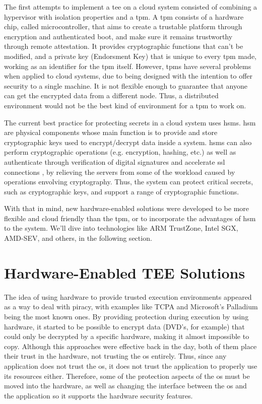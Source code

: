 The first attempts to implement a \gls{tee} on a cloud system consisted of combining a hypervisor with isolation properties and a \gls{tpm}. 
A \gls{tpm} \cite{tpmPaper} consists of a hardware chip, called microcontroller, that aims to create a trustable platform through encryption and authenticated boot, and make sure it remains trustworthy through remote attestation. 
It provides cryptographic functions that can't be modified, and a private key (Endorsment Key) that is unique to every \gls{tpm} made, working as an identifier for the \gls{tpm} itself.
However, \gls{tpm}s have several problems when applied to cloud systems, due to being designed with the intention to offer security to a single machine. It is not flexible enough to guarantee that anyone can get the encrypted data from a different node.
Thus, a distributed environment would not be the best kind of environment for a \gls{tpm} to work on.

The current best practice for protecting secrets in a cloud system uses \gls{hsm}s. 
\gls{hsm} \cite{hsmPaper} are physical components whose main function is to provide and store cryptographic keys used to encrypt/decrypt data inside a system. \gls{hsm}s can also perform cryptographic operations (e.g. encryption, hashing, etc.) as well as authenticate through verification of digital signatures and accelerate \gls{ssl} connections \cite{hsmThesis}, by relieving the servers from some of the workload caused by operations envolving cryptography. 
Thus, the system can protect critical secrets, such as cryptographic keys, and support a range of cryptographic functions.

With that in mind, new hardware-enabled solutions were developed to be more flexible and cloud friendly than the \gls{tpm}, or to incorporate the advantages of \gls{hsm} to the system. We'll dive into technologies like ARM TrustZone, Intel SGX, AMD-SEV, and others, in the following section.




\section{Hardware-Enabled TEE Solutions}
\label{sec:hardwareTEEs}

The idea of using hardware to provide trusted execution environments appeared as a way to deal with piracy, with examples like TCPA \cite{tcpaPaper} and Microsoft's Palladium \cite{microsoftPalladium} being the most known ones. By providing protection during execution by using hardware, it started to be possible to encrypt data (DVD's, for example) that could only be decrypted by a specific hardware, making it almost impossible to copy. 
Although this approaches were effective back in the day, both of them place their trust in the hardware, not trusting the \gls{os} entirely. 
Thus, since any application does not trust the \gls{os}, it does not trust the application to properly use its resources either. Therefore, some of the protection aspects of the \gls{os} must be moved into the hardware, as well as changing the interface between the \gls{os} and the application so it supports the hardware security features. 

